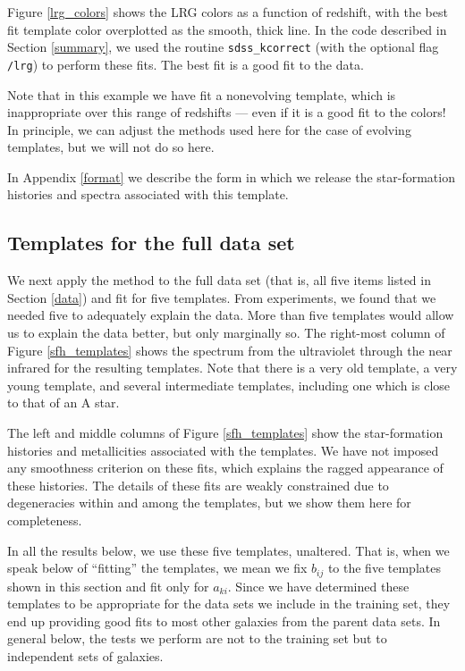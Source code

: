 \documentclass[12pt,preprint]{aastex}
\begin{document}
Figure \ref{lrg_colors} shows the LRG colors as a function of
redshift, with the best fit template color overplotted as the smooth,
thick line. In the code described in Section \ref{summary}, we used the
routine {\tt sdss\_kcorrect} (with the optional flag {\tt /lrg}) to
perform these fits. The best fit is a good fit to the data.

Note that in this example we have fit a nonevolving template, which is
inappropriate over this range of redshifts --- even if it is a good
fit to the colors! In principle, we can adjust the methods used here
for the case of evolving templates, but we will not do so here.

In Appendix \ref{format} we describe the form in which we release 
the star-formation histories and spectra associated with this
template.

\subsection{Templates for the full data set}

We next apply the method to the full data set (that is, all five items
listed in Section \ref{data}) and fit for five templates. From
experiments, we found that we needed five to adequately explain the
data. More than five templates would allow us to explain the data
better, but only marginally so.  The right-most column of Figure
\ref{sfh_templates} shows the spectrum from the ultraviolet through
the near infrared for the resulting templates. Note that there is a
very old template, a very young template, and several intermediate
templates, including one which is close to that of an A star.

The left and middle columns of Figure \ref{sfh_templates} show the
star-formation histories and metallicities associated with the
templates. We have not imposed any smoothness criterion on these fits,
which explains the ragged appearance of these histories.  The details
of these fits are weakly constrained due to degeneracies within and
among the templates, but we show them here for completeness.

In all the results below, we use these five templates, unaltered. That
is, when we speak below of ``fitting'' the templates, we mean we fix
$b_{ij}$ to the five templates shown in this section and fit only for
$a_{ki}$. Since we have determined these templates to be appropriate
for the data sets we include in the training set, they end up
providing good fits to most other galaxies from the parent data sets.
In general below, the tests we perform are not to the training set but
to independent sets of galaxies.
\end{document}
